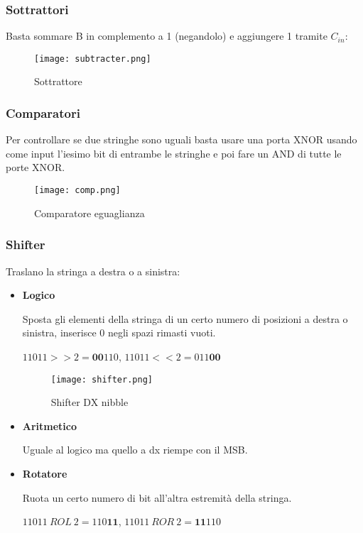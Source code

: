 \documentclass{article}
\begin{document}
\newpage

\subsubsection{Sottrattori}

Basta sommare B in complemento a 1 (negandolo) e aggiungere 1 tramite $C_{in}$:

\begin{figure}[ht]
    \centering
    \texttt{[image: subtracter.png]}
    \caption{Sottrattore}
    \label{fig:enter-label}
\end{figure}

\subsubsection{Comparatori}

Per controllare se due stringhe sono uguali basta usare una porta XNOR usando come input l'iesimo bit di entrambe le stringhe e poi fare un AND di tutte le porte XNOR.

\begin{figure}[ht]
    \centering
    \texttt{[image: comp.png]}
    \caption{Comparatore eguaglianza}
    \label{fig:comp}
\end{figure}

\subsubsection{Shifter}

Traslano la stringa a destra o a sinistra:
\begin{itemize}
    \item \textbf{Logico}
    
    Sposta gli elementi della stringa di un certo numero di posizioni a destra o sinistra, inserisce 0 negli spazi rimasti vuoti.

    $11011 >> 2 = \textbf{00}110$, $11011<<2=011\textbf{00}$

\begin{figure}[ht]
    \centering
    \texttt{[image: shifter.png]}
    \caption{Shifter DX nibble}
    \label{fig:shifter}
\end{figure}
        
    \item \textbf{Aritmetico}
    
    Uguale al logico ma quello a dx riempe con il MSB.
    
    \item \textbf{Rotatore}
    
    Ruota un certo numero di bit all'altra estremità della stringa.

    $11011\ ROL\ 2 = 110\textbf{11}$, $11011\ ROR\ 2=\textbf{11}110$
    
\end{itemize}
\end{document}
